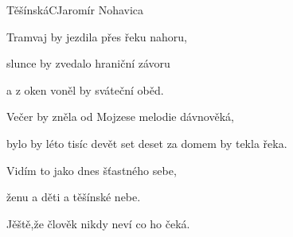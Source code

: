 \begin{song}{Těšínská}{C}{Jaromír Nohavica}
\begin{SBVerse}
Tramvaj by jezdila přes řeku nahoru,

slunce by zvedalo hraniční závoru

a z oken voněl by sváteční oběd.

\end{SBVerse}

\begin{SBVerse}

Večer by zněla od Mojzese melodie dávnověká,

bylo by léto tisíc devět set deset za domem by tekla řeka.

Vidím to jako dnes šťastného sebe,

ženu a děti a těšínské nebe.

Jěště,že člověk nikdy neví co ho čeká.

\end{SBVerse}

\end{song}

\clearpage
